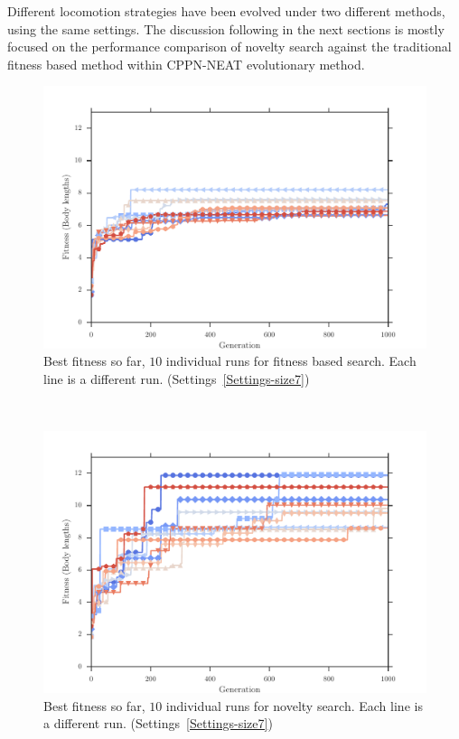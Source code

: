 Different locomotion strategies have been evolved under two different methods, using the same settings. The discussion following in the next sections is mostly focused on the performance comparison of novelty search against the traditional fitness based method within CPPN-NEAT evolutionary method.





\clearpage


\begin{figure}[ht!]
\centering
\includegraphics[width=1.0\textwidth]{../Figures/Results/indRunnAvgSize7Fitness.pdf}
\caption{Best fitness so far, $10$ individual runs for fitness based search. Each line is a different run. (Settings~\ref{Settings-size7})}
\label{fig:indRunsAvgSize10Fitness}
\end{figure}
~
\begin{figure}[ht!]
\centering
\includegraphics[width=1.0\textwidth]{../Figures/Results/indRunnAvgSize7Novelty.pdf}
\caption{Best fitness so far, $10$ individual runs for novelty search. Each line is a different run. (Settings~\ref{Settings-size7})}
\label{fig:indRunnAvgSize10Novelty}
\end{figure}

